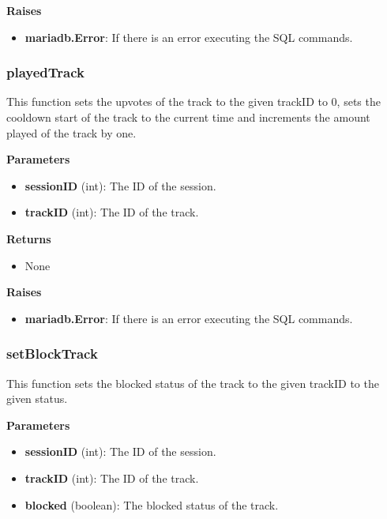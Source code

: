 \documentclass[oneside, ngerman]{sdqtechreport}
\begin{document}
\textbf{Raises}

\begin{itemize} \item \textbf{mariadb.Error}: If there is an error executing the SQL commands. \end{itemize}

\subsubsection{playedTrack}

This function sets the upvotes of the track to the given trackID to 0, sets the cooldown start of the track to the current time and increments the amount played of the track by one.

\textbf{Parameters}

\begin{itemize} \item \textbf{sessionID} (int): The ID of the session. \item \textbf{trackID} (int): The ID of the track. \end{itemize}

\textbf{Returns}

\begin{itemize} \item None \end{itemize}

\textbf{Raises}

\begin{itemize} \item \textbf{mariadb.Error}: If there is an error executing the SQL commands. \end{itemize}

\subsubsection{setBlockTrack}

This function sets the blocked status of the track to the given trackID to the given status.

\textbf{Parameters}

\begin{itemize} \item \textbf{sessionID} (int): The ID of the session. \item \textbf{trackID} (int): The ID of the track. \item \textbf{blocked} (boolean): The blocked status of the track. \end{itemize}
\end{document}
